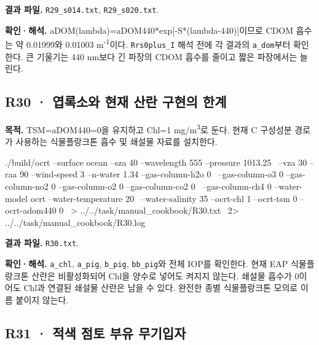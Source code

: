 \textbf{결과 파일. }\texttt{R29\_\allowbreak{}s014.txt}, \texttt{R29\_\allowbreak{}s020.txt}.

\textbf{확인·해석. }aDOM(lambda)=aDOM440*exp[-S*(lambda-440)]이므로 CDOM 흡수는 약 0.01999와 0.01003 m\textsuperscript{-1}이다. \texttt{Rrs0plus\_\allowbreak{}I} 해석 전에 각 결과의 \texttt{a\_\allowbreak{}dom}부터 확인한다. 큰 기울기는 440 nm보다 긴 파장의 CDOM 흡수를 줄이고 짧은 파장에서는 늘린다.


\subsection{R30 · 엽록소와 현재 산란 구현의 한계}
\label{sec:auto:09_cookbook:6.5}

\label{recipe:R30}

\textbf{목적. }TSM=aDOM440=0을 유지하고 Chl=1 mg/m\textsuperscript{3}로 둔다. 현재 C 구성성분 경로가 사용하는 식물플랑크톤 흡수 및 쇄설물 자료를 설치한다.

\noindent\begin{minipage}{\linewidth}
\begin{ManualCode}

./build/ocrt --surface ocean --sza 40 --wavelength 555 --pressure 1013.25 \
  --vza 30 --raa 90 --wind-speed 3 --n-water 1.34 --gas-column-h2o 0 \
  --gas-column-o3 0 --gas-column-no2 0 --gas-column-o2 0 --gas-column-co2 0 \
  --gas-column-ch4 0 --water-model ocrt --water-temperature 20 \
  --water-salinity 35 --ocrt-chl 1 --ocrt-tsm 0 --ocrt-adom440 0 \
  > ../../task/manual_cookbook/R30.txt \
  2> ../../task/manual_cookbook/R30.log

\end{ManualCode}
\end{minipage}\par

\textbf{결과 파일. }\texttt{R30.txt}.

\textbf{확인·해석. }\texttt{a\_\allowbreak{}chl}, \texttt{a\_\allowbreak{}pig}, \texttt{b\_\allowbreak{}pig}, \texttt{bb\_\allowbreak{}pig}와 전체 IOP를 확인한다. 현재 EAP 식물플랑크톤 산란은 비활성화되어 Chl을 양수로 넣어도 켜지지 않는다. 쇄설물 흡수가 0이어도 Chl과 연결된 쇄설물 산란은 남을 수 있다. 완전한 종별 식물플랑크톤 모의로 이름 붙이지 않는다.


\subsection{R31 · 적색 점토 부유 무기입자}
\label{sec:auto:09_cookbook:6.6}


